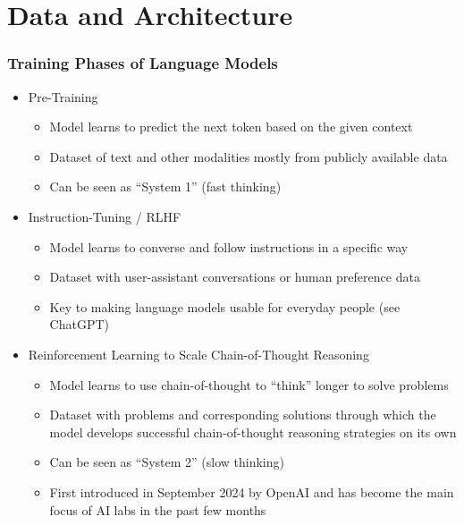 \documentclass[aspectratio=169]{beamer}
\begin{document}
    \section{Data and Architecture}
    \begin{frame}
        \frametitle{Training Phases of Language Models}
        \begin{itemize}
            \item Pre-Training~\parencite{radford_language_2019}
            \begin{itemize}
                \item Model learns to predict the next token based on the given context
                \item Dataset of text and other modalities mostly from publicly available data
                \item Can be seen as ``System 1'' (fast thinking)
            \end{itemize}
            \item Instruction-Tuning / RLHF~\parencite{wei_finetuned_2021, ouyang_training_2022}
            \begin{itemize}
                \item Model learns to converse and follow instructions in a specific way
                \item Dataset with user-assistant conversations or human preference data
                \item Key to making language models usable for everyday people (see ChatGPT)
            \end{itemize}
            \item Reinforcement Learning to Scale Chain-of-Thought Reasoning~\parencite{openai_o1_system_card_2024}
            \begin{itemize}
                \item Model learns to use chain-of-thought to ``think'' longer to solve problems
                \item Dataset with problems and corresponding solutions through which the model develops successful chain-of-thought reasoning strategies on its own
                \item Can be seen as ``System 2'' (slow thinking)
                \item First introduced in September 2024 by OpenAI and has become the main focus of AI labs in the past few months
            \end{itemize}
        \end{itemize}
    \end{frame}
\end{document}
